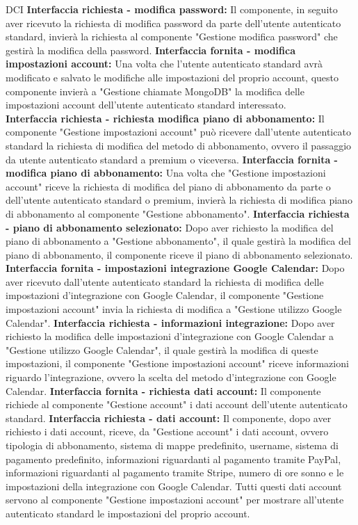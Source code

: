 \begin{listaPersonale}{DCI}
    \textbf{Interfaccia richiesta - modifica password:} Il componente, in seguito aver ricevuto la richiesta di modifica password da parte dell'utente autenticato standard, invierà la richiesta al componente "Gestione modifica password" che gestirà la modifica della password.
    \textbf{Interfaccia fornita - modifica impostazioni account:} Una volta che l'utente autenticato standard avrà modificato e salvato le modifiche alle impostazioni del proprio account, questo componente invierà a "Gestione chiamate MongoDB" la modifica delle impostazioni account dell'utente autenticato standard interessato. \\
    \textbf{Interfaccia richiesta - richiesta modifica piano di
        abbonamento:} Il componente "Gestione impostazioni account" può ricevere dall'utente autenticato standard la richiesta di modifica del metodo di abbonamento, ovvero il passaggio da utente autenticato standard a premium o viceversa.
    \textbf{Interfaccia fornita - modifica piano di abbonamento:} Una volta che "Gestione impostazioni account" riceve la richiesta di modifica del piano di abbonamento da parte o dell'utente autenticato standard o premium, invierà la richiesta di modifica piano di abbonamento al componente "Gestione abbonamento".
    \textbf{Interfaccia richiesta - piano di abbonamento selezionato:} Dopo aver richiesto la modifica del piano di abbonamento a "Gestione abbonamento", il quale gestirà la modifica del piano di abbonamento, il componente riceve il piano di abbonamento selezionato.
    \textbf{Interfaccia fornita - impostazioni integrazione Google
        Calendar:} Dopo aver ricevuto dall'utente autenticato standard la richiesta di modifica delle impostazioni d'integrazione con Google Calendar, il componente "Gestione impostazioni account" invia la richiesta di modifica a "Gestione utilizzo Google Calendar".
    \textbf{Interfaccia richiesta - informazioni integrazione:} Dopo aver richiesto la modifica delle impostazioni d'integrazione con Google Calendar a "Gestione utilizzo Google Calendar", il quale gestirà la modifica di queste impostazioni, il componente "Gestione impostazioni account" riceve informazioni riguardo l'integrazione, ovvero la scelta del metodo d'integrazione con Google Calendar.
    \textbf{Interfaccia fornita - richiesta dati account:} Il componente richiede al componente "Gestione account" i dati account dell'utente autenticato standard.
    \textbf{Interfaccia richiesta - dati account:} Il componente, dopo aver richiesto i dati account, riceve, da "Gestione account" i dati account, ovvero tipologia di abbonamento, sistema di mappe predefinito, username, sistema di pagamento predefinito, informazioni riguardanti al pagamento tramite PayPal, informazioni riguardanti al pagamento tramite Stripe, numero di ore sonno e le impostazioni della integrazione con Google Calendar. Tutti questi dati account servono al componente "Gestione impostazioni account" per mostrare all'utente autenticato standard le impostazioni del proprio account.



\end{listaPersonale}
